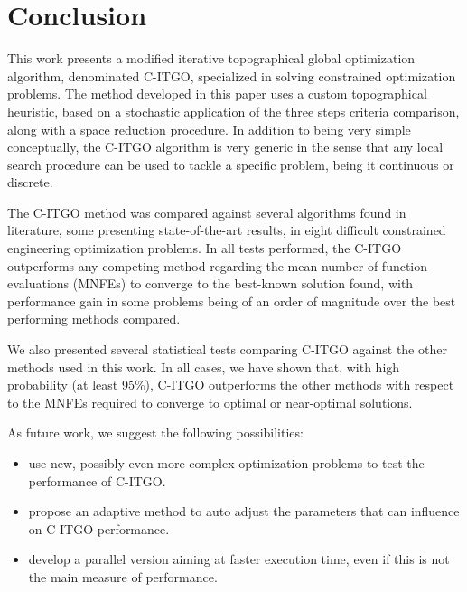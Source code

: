 \section{Conclusion} \label{sec:Conclusion}

This work presents a modified iterative topographical global optimization algorithm, denominated C-ITGO, specialized in solving constrained optimization problems. The method developed in this paper uses a custom topographical heuristic, based on a stochastic application of the three steps criteria comparison, along with a space reduction procedure. In addition to being very simple conceptually, the C-ITGO algorithm is very generic in the sense that any local search procedure can be used to tackle a specific problem, being it continuous or discrete.

The C-ITGO method was compared against several algorithms found in literature, some presenting state-of-the-art results, in eight difficult constrained engineering optimization problems. In all tests performed, the C-ITGO outperforms any competing method regarding the mean number of function evaluations (MNFEs) to converge to the best-known solution found, with performance gain in some problems being of an order of magnitude over the best performing methods compared.

We also presented several statistical tests comparing C-ITGO against the other methods used in this work. In all cases, we have shown that, with high probability (at least 95\%), C-ITGO outperforms the other methods with respect to the MNFEs required to converge to optimal or near-optimal solutions.

As future work, we suggest the following possibilities:


\begin{itemize}

    \item use new, possibly even more complex optimization problems to test the performance of C-ITGO.

    \item propose an adaptive method to auto adjust the parameters that can influence on C-ITGO performance.

    \item develop a parallel version aiming at faster execution time, even if this is not the main measure of performance.


\end{itemize}